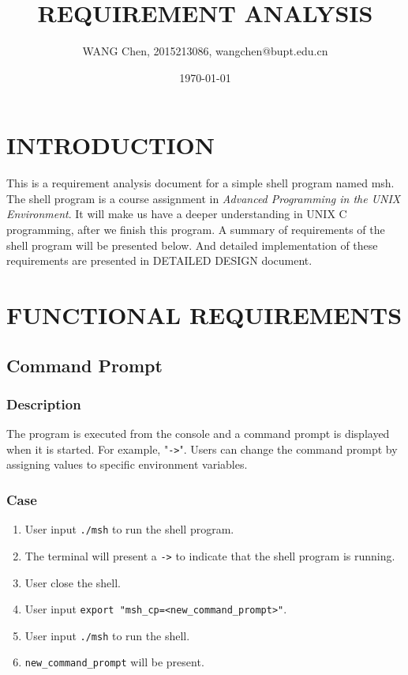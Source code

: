 \documentclass{article}
\title{REQUIREMENT ANALYSIS}
\author{WANG Chen, 2015213086, wangchen@bupt.edu.cn}
\date{\today}
\begin{document}
\maketitle

\tableofcontents

\newpage
\section{INTRODUCTION}
This is a requirement analysis document for a simple shell program named msh.
The shell program is a course assignment in \emph{Advanced Programming in the UNIX Environment}.
It will make us have a deeper understanding in UNIX C programming, after we finish this program.
A summary of requirements of the shell program will be presented below.
And detailed implementation of these requirements are presented in DETAILED DESIGN document.

\newpage
\section{FUNCTIONAL REQUIREMENTS}

\subsection{Command Prompt}
\subsubsection{Description}
The program is executed from the console and a command prompt is displayed when it is started. For example, "\verb|->|". Users can change the command prompt by assigning values to specific environment variables.

\subsubsection{Case}
\begin{enumerate}
\item User input \verb|./msh| to run the shell program.
\item The terminal will present a \verb|->| to indicate that the shell program is running.
\item User close the shell.
\item User input \verb|export "msh_cp=<new_command_prompt>"|.
\item User input \verb|./msh| to run the shell.
\item \verb|new_command_prompt| will be present.
\end{enumerate}
\end{document}
